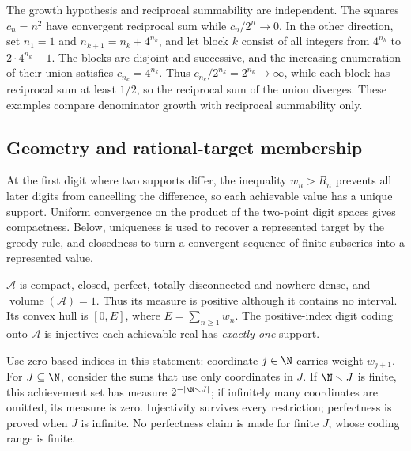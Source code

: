 The growth hypothesis and reciprocal summability are independent. The
squares $c_n=n^2$ have convergent reciprocal sum while $c_n/2^n\to0$.  In the other direction,
set $n_1=1$ and $n_{k+1}=n_k+4^{n_k}$, and let block $k$ consist of
all integers from $4^{n_k}$ to $2\cdot4^{n_k}-1$. The blocks are disjoint
and successive, and the increasing enumeration of their union satisfies
$c_{n_k}=4^{n_k}$. Thus $c_{n_k}/2^{n_k}=2^{n_k}\to\infty$, while each
block has reciprocal sum at least $1/2$, so the reciprocal sum of the
union diverges. These examples compare denominator growth with
reciprocal summability only.

\subsection{Geometry and rational-target membership}
At the first digit where two supports differ, the inequality $w_n>R_n$
prevents all later digits from cancelling the difference, so each
achievable value has a unique support. Uniform convergence on the product
of the two-point digit spaces gives compactness. Below, uniqueness is
used to recover a represented target by the greedy rule, and closedness
to turn a convergent sequence of finite subseries into a represented
value.


\begin{thm}
\label{thm:geometry}
$\mathcal{A}$ is compact, closed, perfect, totally disconnected and nowhere dense, and
$\operatorname{volume}(\mathcal{A}) = 1$.  Thus its measure is positive
although it contains no interval.  Its convex hull is $[0,E]$, where
$E=\sum_{n\ge1}w_n$.  The positive-index digit coding onto
$\mathcal{A}$ is injective: each achievable real has \emph{exactly one} support.
\end{thm}

\begin{thm}
\label{thm:supported-dichotomy}
Use zero-based indices in this statement: coordinate $j\in\N$ carries
weight $w_{j+1}$.  For $J\subseteq\N$, consider the sums that use only
coordinates in $J$.  If $\N\smallsetminus J$ is finite, this achievement set
has measure $2^{-|\N\smallsetminus J|}$; if infinitely many coordinates are
omitted, its measure is zero.  Injectivity survives every restriction;
perfectness is proved when $J$ is infinite.  No perfectness claim is made for
finite $J$, whose coding range is finite.
\end{thm}

